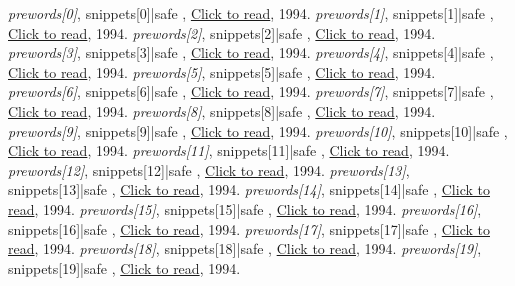 \documentclass{article}
\begin{document}
\begin{thebibliography}{99}

\emph{ {{prewords[0]}}}, { {{snippets[0]|safe }} }, \href{http://www.google.com}{Click to read}, 1994.
\emph{
{{prewords[1]}}}, { {{snippets[1]|safe }} }, \href{http://www.google.com}{Click to read}, 1994.
\emph{
{{prewords[2]}}}, { {{snippets[2]|safe }} }, \href{http://www.google.com}{Click to read}, 1994.
\emph{
{{prewords[3]}}}, { {{snippets[3]|safe }} }, \href{http://www.google.com}{Click to read}, 1994.
\emph{
{{prewords[4]}}}, { {{snippets[4]|safe }} }, \href{http://www.google.com}{Click to read}, 1994.
\emph{
{{prewords[5]}}}, { {{snippets[5]|safe }} }, \href{http://www.google.com}{Click to read}, 1994.
\emph{
{{prewords[6]}}}, { {{snippets[6]|safe }} }, \href{http://www.google.com}{Click to read}, 1994.
\emph{
{{prewords[7]}}}, { {{snippets[7]|safe }} }, \href{http://www.google.com}{Click to read}, 1994.
\emph{
{{prewords[8]}}}, { {{snippets[8]|safe }} }, \href{http://www.google.com}{Click to read}, 1994.
\emph{
{{prewords[9]}}}, { {{snippets[9]|safe }} }, \href{http://www.google.com}{Click to read}, 1994.
\emph{
{{prewords[10]}}}, { {{snippets[10]|safe }} }, \href{http://www.google.com}{Click to read}, 1994.
\emph{
{{prewords[11]}}}, { {{snippets[11]|safe }} }, \href{http://www.google.com}{Click to read}, 1994.
\emph{
{{prewords[12]}}}, { {{snippets[12]|safe }} }, \href{http://www.google.com}{Click to read}, 1994.
\emph{
{{prewords[13]}}}, { {{snippets[13]|safe }} }, \href{http://www.google.com}{Click to read}, 1994.
\emph{
{{prewords[14]}}}, { {{snippets[14]|safe }} }, \href{http://www.google.com}{Click to read}, 1994.
\emph{
{{prewords[15]}}}, { {{snippets[15]|safe }} }, \href{http://www.google.com}{Click to read}, 1994.
\emph{
{{prewords[16]}}}, { {{snippets[16]|safe }} }, \href{http://www.google.com}{Click to read}, 1994.
\emph{
{{prewords[17]}}}, { {{snippets[17]|safe }} }, \href{http://www.google.com}{Click to read}, 1994.
\emph{
{{prewords[18]}}}, { {{snippets[18]|safe }} }, \href{http://www.google.com}{Click to read}, 1994.
\emph{
{{prewords[19]}}}, { {{snippets[19]|safe }} }, \href{http://www.google.com}{Click to read}, 1994.



\end{thebibliography}
\end{document}
